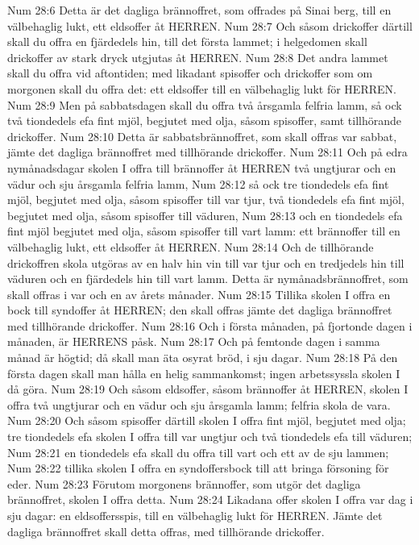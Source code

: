 Num 28:6  Detta är det dagliga brännoffret, som offrades på Sinai berg, till en välbehaglig lukt, ett eldsoffer åt HERREN.
Num 28:7  Och såsom drickoffer därtill skall du offra en fjärdedels hin, till det första lammet; i helgedomen skall drickoffer av stark dryck utgjutas åt HERREN.
Num 28:8  Det andra lammet skall du offra vid aftontiden; med likadant spisoffer och drickoffer som om morgonen skall du offra det: ett eldsoffer till en välbehaglig lukt för HERREN.
Num 28:9  Men på sabbatsdagen skall du offra två årsgamla felfria lamm, så ock två tiondedels efa fint mjöl, begjutet med olja, såsom spisoffer, samt tillhörande drickoffer.
Num 28:10  Detta är sabbatsbrännoffret, som skall offras var sabbat, jämte det dagliga brännoffret med tillhörande drickoffer.
Num 28:11  Och på edra nymånadsdagar skolen I offra till brännoffer åt HERREN två ungtjurar och en vädur och sju årsgamla felfria lamm,
Num 28:12  så ock tre tiondedels efa fint mjöl, begjutet med olja, såsom spisoffer till var tjur, två tiondedels efa fint mjöl, begjutet med olja, såsom spisoffer till väduren,
Num 28:13  och en tiondedels efa fint mjöl begjutet med olja, såsom spisoffer till vart lamm: ett brännoffer till en välbehaglig lukt, ett eldsoffer åt HERREN.
Num 28:14  Och de tillhörande drickoffren skola utgöras av en halv hin vin till var tjur och en tredjedels hin till väduren och en fjärdedels hin till vart lamm. Detta är nymånadsbrännoffret, som skall offras i var och en av årets månader.
Num 28:15  Tillika skolen I offra en bock till syndoffer åt HERREN; den skall offras jämte det dagliga brännoffret med tillhörande drickoffer.
Num 28:16  Och i första månaden, på fjortonde dagen i månaden, är HERRENS påsk.
Num 28:17  Och på femtonde dagen i samma månad är högtid; då skall man äta osyrat bröd, i sju dagar.
Num 28:18  På den första dagen skall man hålla en helig sammankomst; ingen arbetssyssla skolen I då göra.
Num 28:19  Och såsom eldsoffer, såsom brännoffer åt HERREN, skolen I offra två ungtjurar och en vädur och sju årsgamla lamm; felfria skola de vara.
Num 28:20  Och såsom spisoffer därtill skolen I offra fint mjöl, begjutet med olja; tre tiondedels efa skolen I offra till var ungtjur och två tiondedels efa till väduren;
Num 28:21  en tiondedels efa skall du offra till vart och ett av de sju lammen;
Num 28:22  tillika skolen I offra en syndoffersbock till att bringa försoning för eder.
Num 28:23  Förutom morgonens brännoffer, som utgör det dagliga brännoffret, skolen I offra detta.
Num 28:24  Likadana offer skolen I offra var dag i sju dagar: en eldsoffersspis, till en välbehaglig lukt för HERREN. Jämte det dagliga brännoffret skall detta offras, med tillhörande drickoffer.
